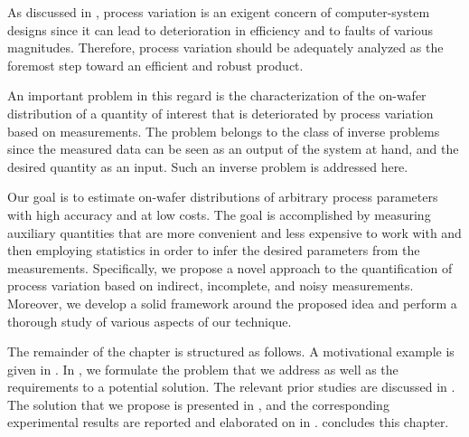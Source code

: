 As discussed in , process variation is an exigent
concern of computer-system designs since it can lead to deterioration in
efficiency and to faults of various magnitudes. Therefore, process variation
should be adequately analyzed as the foremost step toward an efficient and
robust product.

An important problem in this regard is the characterization of the on-wafer
distribution of a quantity of interest that is deteriorated by process variation
based on measurements. The problem belongs to the class of inverse problems
since the measured data can be seen as an output of the system at hand, and the
desired quantity as an input. Such an inverse problem is addressed here.

Our goal is to estimate on-wafer distributions of arbitrary process parameters
with high accuracy and at low costs. The goal is accomplished by measuring
auxiliary quantities that are more convenient and less expensive to work with
and then employing statistics in order to infer the desired parameters from the
measurements. Specifically, we propose a novel approach to the quantification of
process variation based on indirect, incomplete, and noisy measurements.
Moreover, we develop a solid framework around the proposed idea and perform a
thorough study of various aspects of our technique.

The remainder of the chapter is structured as follows. A motivational example is
given in . In , we formulate
the problem that we address as well as the requirements to a potential solution.
The relevant prior studies are discussed in . The solution
that we propose is presented in , and the corresponding
experimental results are reported and elaborated on in .
 concludes this chapter.
